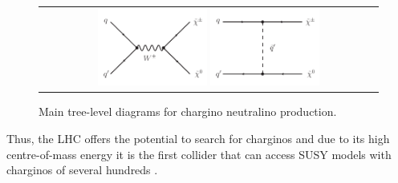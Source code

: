 \begin{figure}[!h]
  \centering 
  \begin{tabular}{c}
    \includegraphics[width=0.33\textwidth]{figures/analysis/ChiChi0_WBoson.pdf}
    \includegraphics[width=0.33\textwidth]{figures/analysis/ChiChi0_Squark.pdf}
  \end{tabular}
  \caption{Main tree-level diagrams for chargino neutralino production.}
  \label{fig:FeynmanDiagramProductionCharginoNeutralino}
\end{figure}
Thus, the LHC offers the potential to search for charginos and due to its high centre-of-mass energy it is the first collider that can access SUSY models with charginos of several hundreds \gev.


